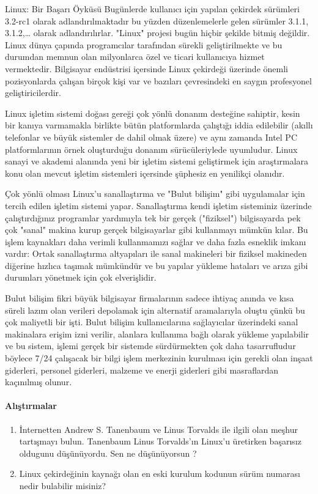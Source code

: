 \begin{section}{Linux: Bir Başarı Öyküsü}
Bugünlerde kullanıcı için yapılan çekirdek sürümleri 3.2-rc1 olarak adlandırılmaktadır bu yüzden düzenlemelerle gelen sürümler 3.1.1, 3.1.2,… olarak adlandırılırlar. "Linux" projesi bugün hiçbir şekilde bitmiş değildir. Linux dünya çapında programcılar tarafından sürekli geliştirilmekte ve bu  durumdan memnun olan milyonlarca özel ve ticari kullanıcıya hizmet vermektedir. Bilgisayar endüstrisi içersinde  Linux çekirdeği üzerinde  önemli pozisyonlarda çalışan birçok kişi var ve bazıları çevresindeki en saygın profesyonel geliştiricilerdir.

Linux işletim sistemi doğası gereği çok yönlü donanım desteğine sahiptir, kesin bir kanıya varmamakla birlikte bütün platformlarda çalıştığı iddia edilebilir (akıllı telefonlar ve büyük sistemler de dahil olmak üzere) ve aynı zamanda Intel PC platformlarının örnek oluşturduğu donanım sürücüleriylede uyumludur. Linux sanayi ve akademi alanında  yeni bir işletim sistemi geliştirmek için araştırmalara konu olan  mevcut işletim sistemleri içersinde şüphesiz en yenilikçi olanıdır.

Çok yönlü olması Linux'u sanallaştırma ve "Bulut bilişim" gibi uygulamalar için tercih edilen işletim sistemi yapar. Sanallaştırma kendi işletim sisteminiz üzerinde çalıştırdığınız programlar yardımıyla tek bir gerçek ("fiziksel") bilgisayarda  pek çok "sanal" makina kurup  gerçek bilgisayarlar gibi kullanmayı mümkün kılar. Bu işlem kaynakları daha verimli kullanmamızı sağlar ve daha fazla esneklik imkanı vardır: Ortak sanallaştırma altyapıları ile sanal makineleri bir fiziksel makineden diğerine hızlıca taşımak mümkündür ve bu yapılar yükleme hataları ve arıza gibi durumları yönetmek için çok elverişlidir.

Bulut bilişim fikri büyük bilgisayar firmalarının sadece ihtiyaç anında ve kısa süreli lazım olan verileri depolamak için alternatif aramalarıyla oluştu çünkü bu çok maliyetli bir işti. Bulut bilişim kullanıcılarına sağlayıcılar üzerindeki sanal makinalara erişim izni verilir, alanlara kullanıma bağlı olarak yükleme yapılabilir ve bu sistem, işlemi gerçek bir sistemde sürdürmekten çok daha tasarrufludur böylece 7/24 çalışacak bir bilgi işlem merkezinin kurulması için gerekli olan inşaat giderleri, personel giderleri, malzeme ve enerji giderleri gibi masraflardan kaçınılmış olunur.
\paragraph{{\Huge{\PencilLeftDown}}Alıştırmalar}{
\begin{enumerate}
 \item İnternetten Andrew S. Tanenbaum ve Linus Torvalds ile ilgili olan meşhur tartışmayı bulun. Tanenbaum Linus Torvalds'ın Linux'u üretirken başarısız oldugunu düşünüyordu. Sen ne düşünüyorsun ?
 \item Linux çekirdeğinin kaynağı olan en eski kurulum kodunun sürüm numarası nedir bulabilir misiniz?
\end{enumerate}}
\end{section}
